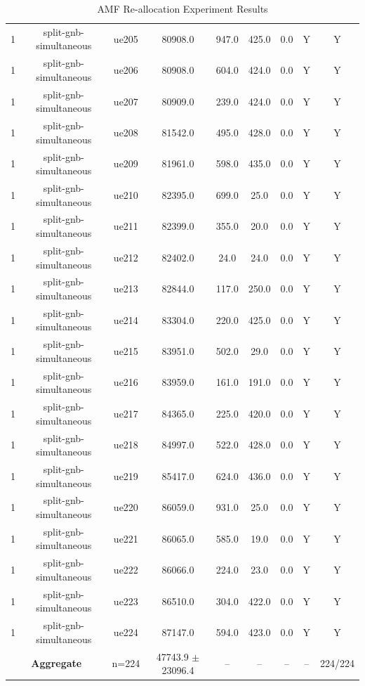 \begin{table}[ht]
\begin{tabular}{|c|c|c|c|c|c|c|c|c|}
1 & split-gnb-simultaneous & ue205 & 80908.0 & 947.0 & 425.0 & 0.0 & Y & Y \\
1 & split-gnb-simultaneous & ue206 & 80908.0 & 604.0 & 424.0 & 0.0 & Y & Y \\
1 & split-gnb-simultaneous & ue207 & 80909.0 & 239.0 & 424.0 & 0.0 & Y & Y \\
1 & split-gnb-simultaneous & ue208 & 81542.0 & 495.0 & 428.0 & 0.0 & Y & Y \\
1 & split-gnb-simultaneous & ue209 & 81961.0 & 598.0 & 435.0 & 0.0 & Y & Y \\
1 & split-gnb-simultaneous & ue210 & 82395.0 & 699.0 & 25.0 & 0.0 & Y & Y \\
1 & split-gnb-simultaneous & ue211 & 82399.0 & 355.0 & 20.0 & 0.0 & Y & Y \\
1 & split-gnb-simultaneous & ue212 & 82402.0 & 24.0 & 24.0 & 0.0 & Y & Y \\
1 & split-gnb-simultaneous & ue213 & 82844.0 & 117.0 & 250.0 & 0.0 & Y & Y \\
1 & split-gnb-simultaneous & ue214 & 83304.0 & 220.0 & 425.0 & 0.0 & Y & Y \\
1 & split-gnb-simultaneous & ue215 & 83951.0 & 502.0 & 29.0 & 0.0 & Y & Y \\
1 & split-gnb-simultaneous & ue216 & 83959.0 & 161.0 & 191.0 & 0.0 & Y & Y \\
1 & split-gnb-simultaneous & ue217 & 84365.0 & 225.0 & 420.0 & 0.0 & Y & Y \\
1 & split-gnb-simultaneous & ue218 & 84997.0 & 522.0 & 428.0 & 0.0 & Y & Y \\
1 & split-gnb-simultaneous & ue219 & 85417.0 & 624.0 & 436.0 & 0.0 & Y & Y \\
1 & split-gnb-simultaneous & ue220 & 86059.0 & 931.0 & 25.0 & 0.0 & Y & Y \\
1 & split-gnb-simultaneous & ue221 & 86065.0 & 585.0 & 19.0 & 0.0 & Y & Y \\
1 & split-gnb-simultaneous & ue222 & 86066.0 & 224.0 & 23.0 & 0.0 & Y & Y \\
1 & split-gnb-simultaneous & ue223 & 86510.0 & 304.0 & 422.0 & 0.0 & Y & Y \\
1 & split-gnb-simultaneous & ue224 & 87147.0 & 594.0 & 423.0 & 0.0 & Y & Y \\
\multicolumn{2}{|c|}{\textbf{Aggregate}} & n=224 & 47743.9 $\pm$ 23096.4 & -- & -- & -- & -- & 224/224 \\
\hline
\end{tabular}
\caption{AMF Re-allocation Experiment Results}
\label{tab:amf_realloc}
\end{table}
